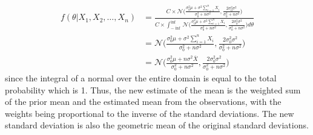 \documentclass[../../probability-notes.tex]{subfiles}
\begin{document}
\begin{align*}
        f(\theta|X_{1}, X_{2}, \ldots, X_{n}) &= \frac{C \times \mathcal{N}\bigg(\frac{\sigma_{0}^{2} \mu + \sigma^{2}\sum_{i=1}^{n} X_{i}}{\sigma_{0}^{2} + n\sigma^{2}}, \frac{2\sigma_{0}^{2} \sigma^{2}}{\sigma_{0}^{2} + n\sigma^{2}}\bigg)}{C \times \int_{-\inf}^{\inf} \mathcal{N}\bigg(\frac{\sigma_{0}^{2} \mu + \sigma^{2}\sum_{i=1}^{n} X_{i}}{\sigma_{0}^{2} + n\sigma^{2}}, \frac{2\sigma_{0}^{2} \sigma^{2}}{\sigma_{0}^{2} + n\sigma^{2}}\bigg) d\theta}\\
        &= \mathcal{N}\bigg(\frac{\sigma_{0}^{2} \mu + \sigma^{2}\sum_{i=1}^{n} X_{i}}{\sigma_{0}^{2} + n\sigma^{2}}, \frac{2\sigma_{0}^{2} \sigma^{2}}{\sigma_{0}^{2} + n\sigma^{2}}\bigg)\\
        &= \mathcal{N}\bigg(\frac{\sigma_{0}^{2} \mu + n\sigma^{2}\overline{X}}{\sigma_{0}^{2} + n\sigma^{2}}, \frac{2\sigma_{0}^{2} \sigma^{2}}{\sigma_{0}^{2} + n\sigma^{2}}\bigg)
    \end{align*}
    since the integral of a normal over the entire domain is equal to the total probability which is 1. Thus, the new estimate of the mean is the weighted sum of the prior mean and the estimated mean from the observations, with the weights being proportional to the inverse of the standard deviations. The new standard deviation is also the geometric mean of the original standard deviations.
\end{document}
